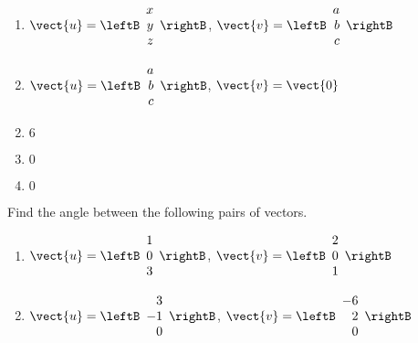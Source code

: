 \begin{multicols}{2}
\begin{ex}
\begin{enumerate}[label={\alph*.}]
\item$\vect{u} = \leftB
\begin{array}{r}
x\\
y\\
z
\end{array}
\rightB$, 
$\vect{v} = \leftB
\begin{array}{r}
a\\
b\\
c
\end{array}
\rightB
$

\item $\vect{u} = \leftB
\begin{array}{r}
a\\
b\\
c
\end{array}
\rightB$, 
$\vect{v} = \vect{0} $

\end{enumerate}
\begin{sol}
\begin{enumerate}[label={\alph*.}]
\setcounter{enumi}{1}
\item  $6$

\setcounter{enumi}{3}
\item  $0$

\setcounter{enumi}{5}
\item  $0$

\end{enumerate}
\end{sol}
\end{ex}

\begin{ex}
Find the angle between the following pairs of vectors.


\begin{enumerate}[label={\alph*.}]
\item $\vect{u} = \leftB
\begin{array}{r}
1\\
0\\
3
\end{array}
\rightB$, 
$\vect{v} = \leftB
\begin{array}{r}
2\\
0\\
1
\end{array}
\rightB
$

\item $\vect{u} = \leftB
\begin{array}{r}
3\\
-1\\
0
\end{array}
\rightB$, 
$\vect{v} = \leftB
\begin{array}{r}
-6\\
2\\
0
\end{array}
\rightB
$


\end{enumerate}
\end{ex}
\end{multicols}
